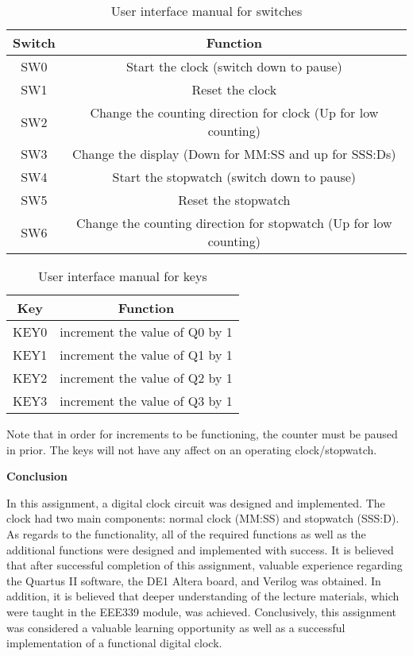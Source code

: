 \documentclass[12pt,a4paper]{article}
\begin{document}
	\begin{table}[H]
		\centering
		\begin{tabular}{|c | c| }
			\hline
			\textbf{Switch} & \textbf{Function} \\ \hline
			SW0& Start the clock (switch down to pause)\\\hline
			SW1& Reset the clock\\\hline
			SW2& Change the counting direction for clock (Up for low counting)\\\hline
			SW3& Change the display (Down for MM:SS and up for SSS:Ds)\\\hline
			SW4& Start the stopwatch (switch down to pause)\\\hline
			SW5& Reset the stopwatch\\\hline
			SW6& Change the counting direction for stopwatch (Up for low counting)\\\hline
		\end{tabular}
		\caption{User interface manual for switches}
	\end{table}

	\vspace{-0.4cm}
	\begin{table}[H]
		\centering
		\begin{tabular}{|c | c| }
			\hline
			\textbf{Key} & \textbf{Function} \\ \hline
			KEY0& increment the value of Q0 by 1\\\hline
			KEY1& increment the value of Q1 by 1\\\hline
			KEY2& increment the value of Q2 by 1\\\hline
			KEY3& increment the value of Q3 by 1\\\hline
		\end{tabular}
		\caption{User interface manual for keys}
	\end{table}
	
	\vspace{-0.2cm}
	\noindent Note that in order for increments to be functioning, the counter must be paused in prior. The keys will not have any affect on an operating clock/stopwatch.
	
	\vspace{0.5cm}
	\noindent \textbf{\Large Conclusion}
	\vspace{0.2cm}
	
	
	\noindent In this assignment, a digital clock circuit was designed and implemented. The clock had two main components: normal clock (MM:SS) and stopwatch (SSS:D). As regards to the functionality, all of the required functions as well as the additional functions were designed and implemented with success. It is believed that after successful completion of this assignment, valuable experience regarding the Quartus II software, the DE1 Altera board, and Verilog was obtained. In addition, it is believed that deeper understanding of the lecture materials, which were taught in the EEE339 module, was achieved. Conclusively, this assignment was considered a valuable learning opportunity as well as a successful implementation of a functional digital clock.
	
\end{document}
